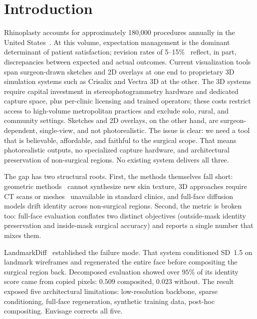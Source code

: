 \documentclass{article}
\newcommand{\method}{Envisage}
\begin{document}
\section{Introduction}
\label{sec:intro}

Rhinoplasty accounts for approximately 180,000 procedures annually in the United
States~\citep{asps2024stats}. At this volume, expectation management is the dominant
determinant of patient satisfaction; revision rates of 5--15\%~\citep{neaman2013rhinoplasty,newman2024revision}
reflect, in part, discrepancies between expected and actual outcomes.
Current visualization tools span surgeon-drawn sketches and 2D overlays at one end
to proprietary 3D simulation systems such as Crisalix and Vectra 3D at the other.
The 3D systems require capital investment in stereophotogrammetry hardware and
dedicated capture space, plus per-clinic licensing and trained operators; these
costs restrict access to high-volume metropolitan practices and exclude solo,
rural, and community settings. Sketches and 2D overlays, on the other hand, are surgeon-dependent,
single-view, and not photorealistic. The issue is clear: we need a tool
that is believable, affordable, and faithful to the surgical scope. That
means photorealistic outputs, no specialized capture hardware, and
architectural preservation of non-surgical regions. No existing system delivers all
three.

The gap has two structural roots. First, the methods themselves fall short:
geometric methods~\citep{bookstein1989tps} cannot
synthesize new skin texture, 3D approaches require CT scans or
meshes~\citep{ma2021orthognathic} unavailable in standard clinics, and full-face
diffusion models drift identity across non-surgical regions. Second, the
metric is broken too: full-face evaluation conflates two distinct objectives
(outside-mask identity preservation and inside-mask surgical accuracy) and
reports a single number that mixes them.

LandmarkDiff~\citep{landmarkdiff_anon} established the failure mode. That
system conditioned SD~1.5 on landmark wireframes and regenerated the entire
face before compositing the surgical region back. Decomposed evaluation
showed over $95\%$ of its identity score came from copied pixels: $0.509$
composited, $0.023$ without. The result exposed five architectural
limitations: low-resolution backbone, sparse conditioning, full-face
regeneration, synthetic training data, post-hoc compositing. \method{}
corrects all five.
\end{document}
